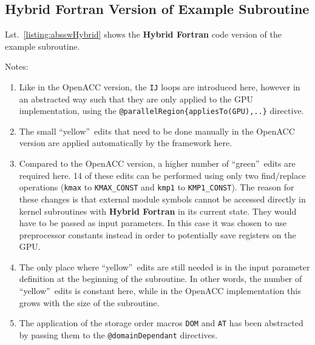 \subsection{Hybrid Fortran Version of Example Subroutine}

Lst.~\ref{listing:absswHybrid} shows the \textbf{Hybrid Fortran} code version of the example subroutine.

Notes:
\begin{enumerate}
 \item Like in the OpenACC version, the \verb|IJ| loops are introduced here, however in an abstracted way such that they are only applied to the GPU implementation, using the \verb|@parallelRegion{appliesTo(GPU),..}| directive.
 \item The small \textquotedblleft yellow\textquotedblright\ edits that need to be done manually in the OpenACC version are applied automatically by the framework here.
 \item Compared to the OpenACC version, a higher number of \textquotedblleft green\textquotedblright\ edits are required here. 14 of these edits can be performed using only two find/replace operations (\verb|kmax| to \verb|KMAX_CONST| and \verb|kmp1| to \verb|KMP1_CONST|). The reason for these changes is that external module symbols cannot be accessed directly in kernel subroutines with \textbf{Hybrid Fortran} in its current state. They would have to be passed as input parameters. In this case it was chosen to use preprocessor constants instead in order to potentially save registers on the GPU.
 \item The only place where \textquotedblleft yellow\textquotedblright\ edits are still needed is in the input parameter definition at the beginning of the subroutine. In other words, the number of \textquotedblleft yellow\textquotedblright\ edits is constant here, while in the OpenACC implementation this grows with the size of the subroutine.
 \item The application of the storage order macros \verb|DOM| and \verb|AT| has been abstracted by passing them to the \verb|@domainDependant| directives.
\end{enumerate}

